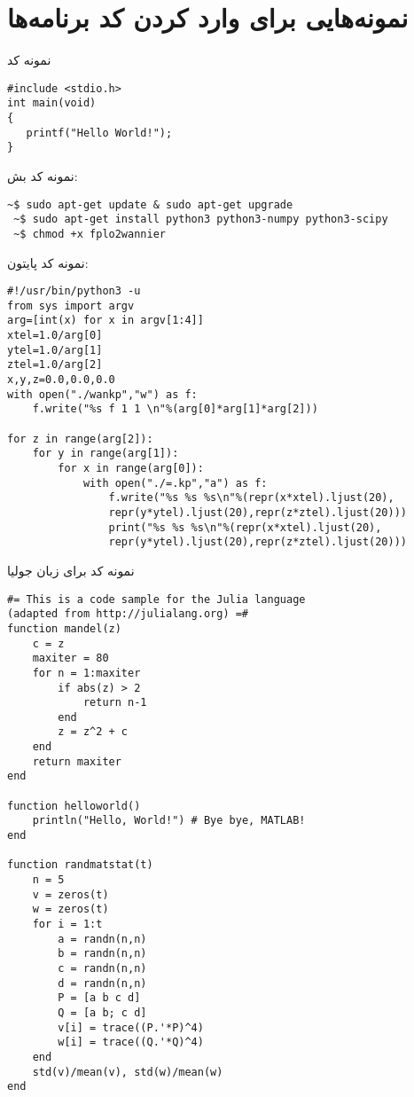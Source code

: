 \chapter{نمونه‌هایی برای وارد کردن کد برنامه‌ها}\label{App:RefMan1}
\thispagestyle{empty}
نمونه کد 
\begin{latin}
\begin{lstlisting}[style=CStyle]
#include <stdio.h>
int main(void)
{
   printf("Hello World!"); 
}
\end{lstlisting}
\end{latin}
نمونه کد بش:
\begin{latin}
\begin{lstlisting}[style=Mybash]
 ~$ sudo apt-get update & sudo apt-get upgrade
 ~$ sudo apt-get install python3 python3-numpy python3-scipy
 ~$ chmod +x fplo2wannier
\end{lstlisting}
\end{latin}
نمونه کد پایتون:
\begin{latin}
\begin{lstlisting}[style=Mypython]
 #!/usr/bin/python3 -u
from sys import argv
arg=[int(x) for x in argv[1:4]]
xtel=1.0/arg[0]
ytel=1.0/arg[1]
ztel=1.0/arg[2]
x,y,z=0.0,0.0,0.0
with open("./wankp","w") as f:
	f.write("%s f 1 1 \n"%(arg[0]*arg[1]*arg[2]))
	
for z in range(arg[2]):
	for y in range(arg[1]):
		for x in range(arg[0]):
			with open("./=.kp","a") as f:
				f.write("%s %s %s\n"%(repr(x*xtel).ljust(20),
                repr(y*ytel).ljust(20),repr(z*ztel).ljust(20)))
				print("%s %s %s\n"%(repr(x*xtel).ljust(20),
                repr(y*ytel).ljust(20),repr(z*ztel).ljust(20)))
\end{lstlisting}
\end{latin}
نمونه کد برای زبان جولیا
\begin{latin}
\begin{lstlisting}[style=julia]
#= This is a code sample for the Julia language
(adapted from http://julialang.org) =#
function mandel(z)
    c = z
    maxiter = 80
    for n = 1:maxiter
        if abs(z) > 2
            return n-1
        end
        z = z^2 + c
    end
    return maxiter
end

function helloworld()
    println("Hello, World!") # Bye bye, MATLAB!
end

function randmatstat(t)
    n = 5
    v = zeros(t)
    w = zeros(t)
    for i = 1:t
        a = randn(n,n)
        b = randn(n,n)
        c = randn(n,n)
        d = randn(n,n)
        P = [a b c d]
        Q = [a b; c d]
        v[i] = trace((P.'*P)^4)
        w[i] = trace((Q.'*Q)^4)
    end
    std(v)/mean(v), std(w)/mean(w)
end
\end{lstlisting}
\end{latin}
